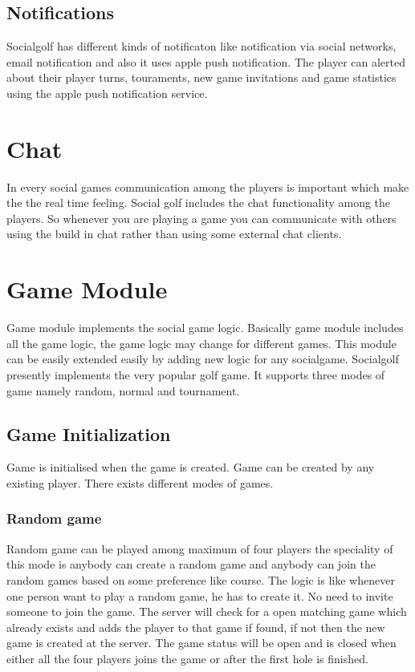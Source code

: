 \documentclass[12pt]{article}
\begin{document}
\subsection{Notifications}
Socialgolf has different kinds of notificaton like notification via social networks, email notification and also it uses apple push notification. The player can alerted about their player turns, touraments, new game invitations  and game statistics using the apple push notification service.

\section{Chat}
In every social games communication among the players is important which make the the real time feeling. Social golf includes the chat functionality among the players. So whenever you are playing a game you can communicate with others using  the build in chat rather than using some external chat clients.

\section{Game Module}
Game module implements the social game logic. Basically game module includes all the game logic, the game logic may change for different games. This module can be easily extended easily by adding new logic for any socialgame. Socialgolf presently implements the very popular golf game. It supports three modes of game namely random, normal and tournament.

\subsection{Game Initialization}
Game is initialised when the game is created. Game can be created by any existing player. There exists different modes of games.
\subsubsection{Random game}
Random game can be played among maximum of four players the speciality of this mode is anybody can create a random game and anybody can join the random games based on some preference like course. The logic is like whenever one person want to play a random game, he has to create it. No need to invite someone to join the game. The server will check for a open matching game which already exists and adds the player to that game if found, if not then the new game is created at the server. The game status will be open and is closed when either all the four players joins the game or after the first hole is finished.
\end{document}
